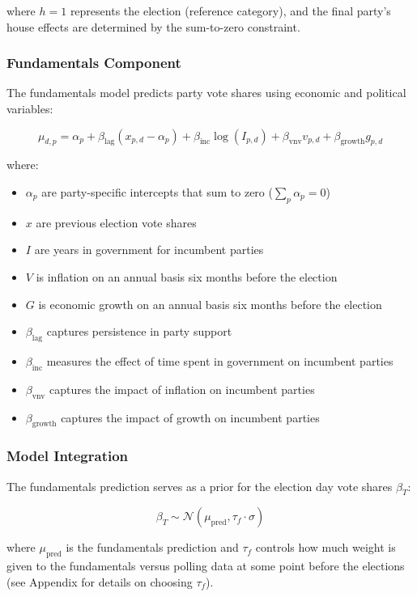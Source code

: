 \documentclass[
  letterpaper,
  DIV=11,
  numbers=noendperiod]{scrartcl}
\providecommand{\tightlist}{%
  \setlength{\itemsep}{0pt}\setlength{\parskip}{0pt}}\usepackage{longtable,booktabs,array}
\begin{document}
where \(h=1\) represents the election (reference category), and the
final party's house effects are determined by the sum-to-zero
constraint.

\subsubsection{Fundamentals Component}\label{fundamentals-component}

The fundamentals model predicts party vote shares using economic and
political variables:

\[
\mu_{d,p} = \alpha_p + \beta_\text{lag}(x_{p,d} - \alpha_p) + \beta_\text{inc}\log(I_{p,d}) + \beta_\text{vnv}v_{p,d} + \beta_\text{growth}g_{p,d}
\]

where:

\begin{itemize}
\tightlist
\item
  \(\alpha_p\) are party-specific intercepts that sum to zero
  (\(\sum_p \alpha_p = 0\))
\item
  \(x\) are previous election vote shares
\item
  \(I\) are years in government for incumbent parties
\item
  \(V\) is inflation on an annual basis six months before the election
\item
  \(G\) is economic growth on an annual basis six months before the
  election
\item
  \(\beta_\text{lag}\) captures persistence in party support
\item
  \(\beta_\text{inc}\) measures the effect of time spent in government
  on incumbent parties
\item
  \(\beta_\text{vnv}\) captures the impact of inflation on incumbent
  parties
\item
  \(\beta_\text{growth}\) captures the impact of growth on incumbent
  parties
\end{itemize}

\subsubsection{Model Integration}\label{model-integration}

The fundamentals prediction serves as a prior for the election day vote
shares \(\beta_T\):

\[
\beta_T \sim \mathcal{N}(\mu_\text{pred}, \tau_f \cdot \sigma)
\]

where \(\mu_\text{pred}\) is the fundamentals prediction and \(\tau_f\)
controls how much weight is given to the fundamentals versus polling
data at some point before the elections (see Appendix for details on
choosing \(\tau_f\)).
\end{document}

